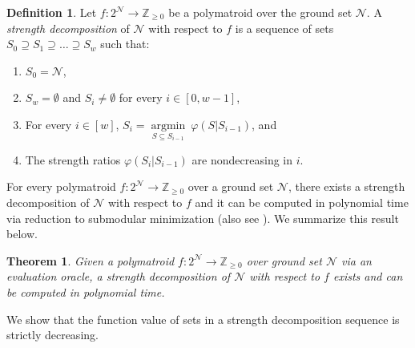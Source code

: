 \documentclass[11pt]{article}
\newtheorem{theorem}{Theorem}
\theoremstyle{definition}
\newtheorem{definition}{Definition}
\newcommand{\calN}{{\mathcal{N}}}
\begin{document}
\begin{definition}\cite{quanrud2024quotient} 
Let $f:2^\mathcal{N}\rightarrow \mathbb{Z}_{\geq 0}$ be a polymatroid over the ground set $\mathcal{N}$. 
    A \emph{strength decomposition} of $\mathcal{N}$ with respect to $f$ is a sequence of sets $S_0\supseteq S_1 \supseteq \ldots \supseteq S_w$ such that:
    \begin{enumerate}[label=(\arabic*)]
        \item $S_0=\mathcal{N}$,
        \item $S_w=\emptyset$ and $S_i\neq \emptyset$ for every $i\in [0,w-1]$,
        \item For every $i\in [w]$, $S_i=\mathop{argmin}\limits_{S\subseteq S_{i-1}} \ \varphi(S|S_{i-1})$, and
        \item The strength ratios $\varphi(S_i|S_{i-1})$ are nondecreasing in $i$.
    \end{enumerate}
\end{definition}

For every polymatroid $f:2^{\mathcal{N}}\rightarrow \mathbb{Z}_{\geq 0}$ over a ground set $\calN$, there exists a strength decomposition of $\calN$ with respect to $f$ and it can be computed in polynomial time via reduction to submodular minimization \cite{Nar91, Narayanan-book, Fuj09} (also see \cite{quanrud2024quotient}). We summarize this result below. 


\begin{theorem}\label{theorem:strength-decomposition}
    Given a polymatroid $f:2^{\mathcal{N}}\rightarrow \mathbb{Z}_{\geq 0}$ over ground set $\mathcal{N}$ via an evaluation oracle, a strength decomposition of $\mathcal{N}$ with respect to $f$ exists and can be computed in polynomial time.
\end{theorem}

We show that the function value of sets in a strength decomposition sequence is strictly decreasing.
\end{document}

